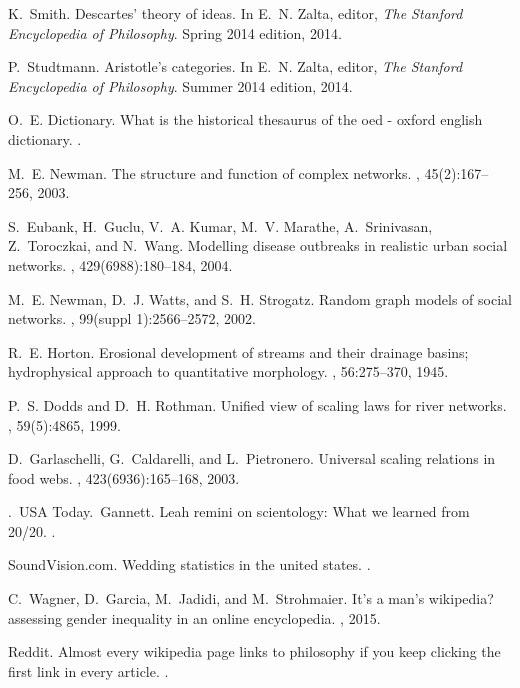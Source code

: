\documentclass[pre,twocolumn,twoside,byrevtex,superscriptaddress,floatfix]{revtex4-1}
\begin{document}
\begin{thebibliography}{10}
K.~Smith.
\newblock Descartes' theory of ideas.
\newblock In E.~N. Zalta, editor, {\em The Stanford Encyclopedia of
  Philosophy}. Spring 2014 edition, 2014.

P.~Studtmann.
\newblock Aristotle's categories.
\newblock In E.~N. Zalta, editor, {\em The Stanford Encyclopedia of
  Philosophy}. Summer 2014 edition, 2014.

O.~E. Dictionary.
\newblock What is the historical thesaurus of the oed - oxford english
  dictionary.
.

M.~E. Newman.
\newblock The structure and function of complex networks.
, 45(2):167--256, 2003.

S.~Eubank, H.~Guclu, V.~A. Kumar, M.~V. Marathe, A.~Srinivasan, Z.~Toroczkai,
  and N.~Wang.
\newblock Modelling disease outbreaks in realistic urban social networks.
, 429(6988):180--184, 2004.

M.~E. Newman, D.~J. Watts, and S.~H. Strogatz.
\newblock Random graph models of social networks.
, 99(suppl
  1):2566--2572, 2002.

R.~E. Horton.
\newblock Erosional development of streams and their drainage basins;
  hydrophysical approach to quantitative morphology.
, 56:275--370, 1945.

P.~S. Dodds and D.~H. Rothman.
\newblock Unified view of scaling laws for river networks.
, 59(5):4865, 1999.

D.~Garlaschelli, G.~Caldarelli, and L.~Pietronero.
\newblock Universal scaling relations in food webs.
, 423(6936):165--168, 2003.

.~USA Today.~Gannett.
\newblock Leah remini on scientology: What we learned from 20/20.
.

SoundVision.com.
\newblock Wedding statistics in the united states.
.

C.~Wagner, D.~Garcia, M.~Jadidi, and M.~Strohmaier.
\newblock It's a man's wikipedia? assessing gender inequality in an online
  encyclopedia.
, 2015.

Reddit.
\newblock Almost every wikipedia page links to philosophy if you keep clicking
  the first link in every article.
.

\end{thebibliography}

\clearpage
\end{document}
